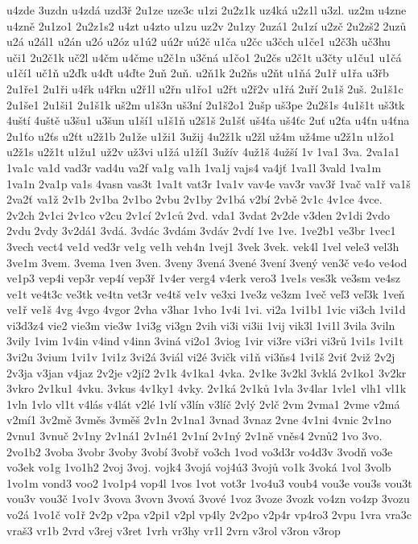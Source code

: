 u4zde
3uzdn
u4zdá
uzd3ř
2u1ze
uze3c
u1zi
2u2z1k
uz4ká
u2z1l
u3zl.
uz2m
u4zne
u4zně
2u1zo1
2u2z1s2
u4zt
u4zto
u1zu
uz2v
2u1zy
2uzá1
2u1zí
u2zč
2u2zš2
2uzů
u2á
u2ál1
u2án
u2ó
u2óz
u1ú2
uú2r
uú2č
u1ča
u2čc
u3čch
u1če1
u2č3h
uč3hu
uči1
2u2č1k
uč2l
u4čm
u4čme
u2č1n
u3čná
u1čo1
2u2čs
u2č1t
u3čty
u1ču1
u1čá
u1čí1
uč1ň
u2ďk
u4ďt
u4ďte
2uň
2uň.
u2ň1k
2u2ňs
u2ňt
u1ňá
2u1ř
u1řa
u3řb
2u1ře1
2u1ři
u4řk
u4řkn
u2ř1l
u2řn
u1řo1
u2řt
u2ř2v
u1řá
2uří
2u1š
2uš.
2u1š1c
2u1še1
2u1ši1
2u1š1k
uš2m
u1š3n
uš3ní
2u1š2o1
2ušp
uš3pe
2u2š1s
4u1š1t
uš3tk
4uští
4uště
u3šu1
u3šun
u1ší1
u1š1ň
u2š1š
2u1šť
uš4ťa
uš4ťc
2uť
u2ťa
u4ťn
u4ťna
2u1ťo
u2ťs
u2ťt
u2ž1b
2u1že
u1ži1
3užij
4u2ž1k
u2žl
už4m
už4me
u2ž1n
u1žo1
u2ž1s
u2ž1t
u1žu1
už2v
už3vi
u1žá
u1ží1
3užív
4už1š
4užší
1v
1va1
3va.
2va1a1
1va1c
va1d
vad3r
vad4u
va2f
va1g
va1h
1va1j
vajs4
va4jť
1va1l
3vald
1va1m
1va1n
2va1p
va1s
4vasn
vas3t
1va1t
vat3r
1va1v
vav4e
vav3r
vav3ř
1vač
va1ř
va1š
2va2ť
va1ž
2v1b
2v1ba
2v1bo
2vbu
2v1by
2v1bá
v2bí
2vbě
2v1c
4v1ce
4vce.
2v2ch
2v1ci
2v1co
v2cu
2v1cí
2v1ců
2vd.
vda1
3vdat
2v2de
v3den
2v1di
2vdo
2vdu
2vdy
3v2dá1
3vdá.
3vdác
3vdám
3vdáv
2vdí
1ve
1ve.
1ve2b1
ve3br
1vec1
3vech
vect4
ve1d
ved3r
ve1g
ve1h
veh4n
1vej1
3vek
3vek.
vek4l
1vel
vele3
vel3h
3ve1m
3vem.
3vema
1ven
3ven.
3veny
3vená
3vené
3vení
3vený
ven3č
ve4o
ve4od
ve1p3
vep4i
vep3r
vep4í
vep3ř
1v4er
verg4
v4erk
vero3
1ve1s
ves3k
ve3sm
ve4sz
ve1t
ve4t3c
ve3tk
ve4tn
vet3r
ve4tš
ve1v
ve3xi
1ve3z
ve3zm
1več
veľ3
veľ3k
1veň
ve1ř
ve1š
4vg
4vgo
4vgor
2vha
v3har
1vho
1v4i
1vi.
vi2a
1vi1b1
1vic
vi3ch
1vi1d
vi3d3z4
vie2
vie3m
vie3w
1vi3g
vi3gn
2vih
vi3i
vi3ii
1vij
vik3l
1vi1l
3vila
3viln
3vily
1vim
1v4in
v4ind
v4inn
3viná
vi2o1
3viog
1vir
vi3re
vi3ri
vi3rů
1vi1s
1vi1t
3vi2u
3vium
1vi1v
1vi1z
3vi2á
3viál
vi2é
3vičk
vi1ň
vi3ňs4
1vi1š
2viť
2viž
2v2j
2v3ja
v3jan
v4jaz
2v2je
v2jí2
2v1k
4v1ka1
4vka.
2v1ke
3v2kl
3vklá
2v1ko1
3v2kr
3vkro
2v1ku1
4vku.
3vkus
4v1ky1
4vky.
2v1ká
2v1ků
1vla
3v4lar
1vle1
vlh1
vl1k
1vln
1vlo
vl1t
v4lás
v4lát
v2lé
1vlí
v3lín
v3líč
2vlý
2vlč
2vm
2vma1
2vme
v2má
v2mí1
3v2mě
3vměs
3vměš
2v1n
2v1na1
3vnad
3vnaz
2vne
4v1ni
4vnic
2v1no
2vnu1
3vnuč
2v1ny
2v1ná1
2v1né1
2v1ní
2v1ný
2v1ně
vněs4
2vnů2
1vo
3vo.
2vo1b2
3voba
3vobr
3voby
3vobí
3vobř
vo3ch
1vod
vo3d3r
vo4d3v
3vodň
vo3e
vo3ek
vo1g
1vo1h2
2voj
3voj.
vojk4
3vojá
voj4ú3
3vojů
vo1k
3voká
1vol
3volb
1vo1m
vond3
voo2
1vo1p4
vop4l
1vos
1vot
vot3r
1vo4u3
voub4
vou3e
vou3s
vou3t
vou3v
vou3č
1vo1v
3vova
3vovn
3vová
3vové
1voz
3voze
3vozk
vo4zn
vo4zp
3vozu
vo2á
1vo1č
vo1ř
2v2p
v2pa
v2pi1
v2pl
vp4ly
2v2po
v2p4r
vp4ro3
2vpu
1vra
vra3c
vraš3
vr1b
2vrd
v3rej
v3ret
1vrh
vr3hy
vr1l
2vrn
v3rol
v3ron
v3rop
